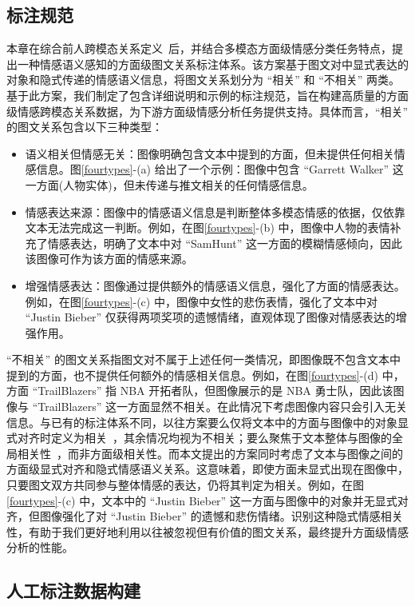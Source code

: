 \subsection{标注规范}
本章在综合前人跨模态关系定义~\cite{chen2013understanding,vempala2019categorizing,xu2022ananet,chen2023joint}后，并结合多模态方面级情感分类任务特点，提出一种情感语义感知的方面级图文关系标注体系。该方案基于图文对中显式表达的对象和隐式传递的情感语义信息，将图文关系划分为 “相关” 和 “不相关” 两类。基于此方案，我们制定了包含详细说明和示例的标注规范，旨在构建高质量的方面级情感跨模态关系数据，为下游方面级情感分析任务提供支持。具体而言，“相关” 的图文关系包含以下三种类型：
\begin{itemize}
  \item 语义相关但情感无关：图像明确包含文本中提到的方面，但未提供任何相关情感信息。图\ref{fourtypes}-(a) 给出了一个示例：图像中包含 “Garrett Walker” 这一方面(人物实体)，但未传递与推文相关的任何情感信息。
  \item 情感表达来源：图像中的情感语义信息是判断整体多模态情感的依据，仅依靠文本无法完成这一判断。例如，在图\ref{fourtypes}-(b) 中，图像中人物的表情补充了情感表达，明确了文本中对 “SamHunt” 这一方面的模糊情感倾向，因此该图像可作为该方面的情感来源。
  \item 增强情感表达：图像通过提供额外的情感语义信息，强化了方面的情感表达。例如，在图\ref{fourtypes}-(c) 中，图像中女性的悲伤表情，强化了文本中对 “Justin Bieber” 仅获得两项奖项的遗憾情绪，直观体现了图像对情感表达的增强作用。
\end{itemize}

“不相关” 的图文关系指图文对不属于上述任何一类情况，即图像既不包含文本中提到的方面，也不提供任何额外的情感相关信息。例如，在图\ref{fourtypes}-(d) 中，方面 “TrailBlazers” 指 NBA 开拓者队，但图像展示的是 NBA 勇士队，因此该图像与 “TrailBlazers” 这一方面显然不相关。在此情况下考虑图像内容只会引入无关信息。与已有的标注体系不同，以往方案要么仅将文本中的方面与图像中的对象显式对齐时定义为相关~\cite{yu2022targeted}，其余情况均视为不相关；要么聚焦于文本整体与图像的全局相关性~\cite{vempala2019categorizing,chen2023joint}，而非方面级相关性。而本文提出的方案同时考虑了文本与图像之间的方面级显式对齐和隐式情感语义关系。这意味着，即使方面未显式出现在图像中，只要图文双方共同参与整体情感的表达，仍将其判定为相关。例如，在图\ref{fourtypes}-(c) 中，文本中的 “Justin Bieber” 这一方面与图像中的对象并无显式对齐，但图像强化了对 “Justin Bieber” 的遗憾和悲伤情绪。识别这种隐式情感相关性，有助于我们更好地利用以往被忽视但有价值的图文关系，最终提升方面级情感分析的性能。

\subsection{人工标注数据构建}

